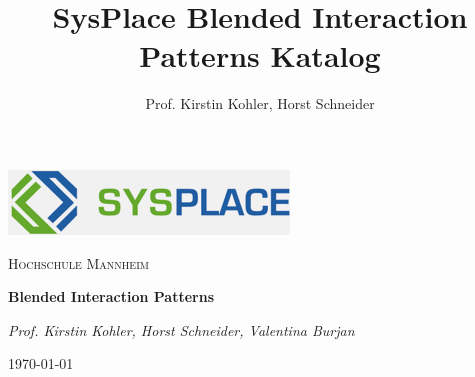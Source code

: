 \documentclass[12pt,a4paper]{article}
\author{Prof. Kirstin Kohler, Horst Schneider}
\title{SysPlace Blended Interaction Patterns Katalog}
\begin{document}
\begin{titlepage}
\centering
\includegraphics[scale=1]{sysplace_logo.png}\par\vspace{1.5cm}
{\scshape\Large Hochschule Mannheim \par}
\vspace{1cm}
{\huge\bfseries Blended Interaction Patterns\par}
\vspace{2.5cm}
{\Large\itshape Prof. Kirstin Kohler, Horst Schneider, Valentina Burjan\par}
\vfill
{\large \today\par}
\end{titlepage}

\pagebreak
\tableofcontents
\end{document}
